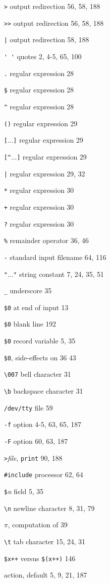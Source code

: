 \begin{multicols}{2}
\verb'>' output redirection 56, 58, 188

\verb'>>' output redirection 56, 58, 188

\verb'|' output redirection 58, 188 

\verb"' '" quotes 2, 4-5, 65, 100

\verb'.' regular expression 28

\verb'$' regular expression 28

\verb'^' regular expression 28

\verb'()' regular expression 29

\verb'['...\verb']' regular expression 29 

\verb'[^'...\verb']' regular expression 29

\verb'|' regular expression 29, 32

\verb'*' regular expression 30

\verb'+' regular expression 30

\verb'?' regular expression 30 

\verb'%' remainder operator 36, 46

\verb'-' standard input filename 64, 116

\verb'"'...\verb'"' string constant 7, 24, 35, 51

\verb'_' underscore 35

\verb'$0' at end of input 13

\verb'$0' blank line 192 

\verb'$0' record variable 5, 35 

\verb'$0', side-effects on 36 43 

\verb'\007' bell character 31 

\verb'\b' backspace character 31 

\verb'/dev/tty' file 59 

\verb'-f' option 4-5, 63, 65, 187 

\verb'-F' option 60, 63, 187 

\verb'>'\textit{file}, \verb'print' 90, 188 

\verb'#include' processor 62, 64 

\verb'$'\textit{n} field 5, 35 

\verb'\n' newline character 8, 31, 79

$\pi$, computation of 39 

\verb'\t' tab character 15, 24, 31 

\verb'$x++' versus \verb'$(x++)' 146 

action, default 5, 9, 21, 187 


\end{multicols}
